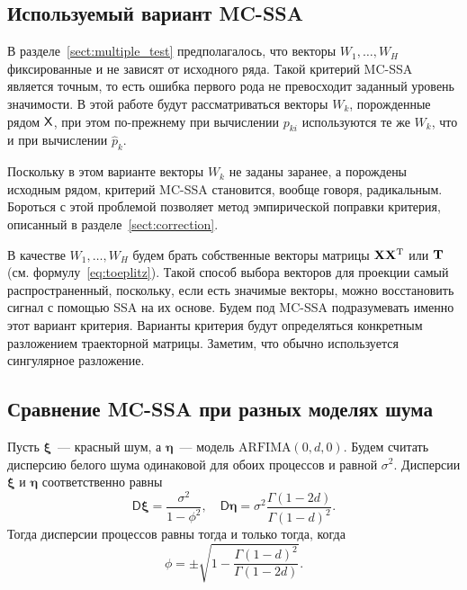 \documentclass[specialist,
substylefile = spbu_report.rtx,
subf,href,colorlinks=true, 12pt]{disser}
\theoremstyle{definition}
\newtheorem{remark}{Замечание}[section]
\begin{document}

\subsection{Используемый вариант MC-SSA}\label{sect:vectors_choise}
В разделе~\ref{sect:multiple_test} предполагалось, что векторы $W_1,\ldots, W_H$ фиксированные и не зависят от исходного ряда. Такой критерий MC-SSA является точным, то есть ошибка первого рода не превосходит заданный уровень значимости. В этой работе будут рассматриваться векторы $W_k$, порожденные рядом $\mathsf{X}$, при этом по-прежнему при вычислении $p_{ki}$ используются те же $W_k$, что и при вычислении $\widehat p_k$.

Поскольку в этом варианте векторы $W_k$ не заданы заранее, а порождены исходным рядом, критерий MC-SSA становится, вообще говоря, радикальным. Бороться с этой проблемой позволяет метод эмпирической поправки критерия, описанный в разделе~\ref{sect:correction}.

В качестве $W_1, \ldots,W_H$ будем брать собственные векторы матрицы $\mathbf{X}\mathbf{X}^{\mathrm{T}}$ или $\mathbf{T}$ (см. формулу~\eqref{eq:toeplitz}). Такой способ выбора векторов для проекции самый распространенный, поскольку, если есть значимые векторы, можно восстановить сигнал с помощью SSA на их основе. Будем под MC-SSA подразумевать именно этот вариант критерия. Варианты критерия будут определяться конкретным разложением траекторной матрицы. Заметим, что обычно используется сингулярное разложение.


\subsection{Сравнение MC-SSA при разных моделях шума}
Пусть $\bm \xi$~--- красный шум, а $\bm \eta$~--- модель $\mathrm{ARFIMA}(0, d, 0)$. Будем считать дисперсию белого шума одинаковой для обоих процессов и равной $\sigma^2$. Дисперсии $\bm\xi$ и $\bm\eta$ соответственно равны
\[
	\mathsf{D}\bm\xi = \frac{\sigma^2}{1 - \phi^2}, \quad \mathsf{D}\bm\eta = \sigma^2\frac{\Gamma(1 - 2d)}{\Gamma(1-d)^2}.
\]
Тогда дисперсии процессов равны тогда и только тогда, когда
\[
	\phi=\pm\sqrt{1-\frac{\Gamma(1-d)^2}{\Gamma(1-2d)}}.
\]
\end{document}

